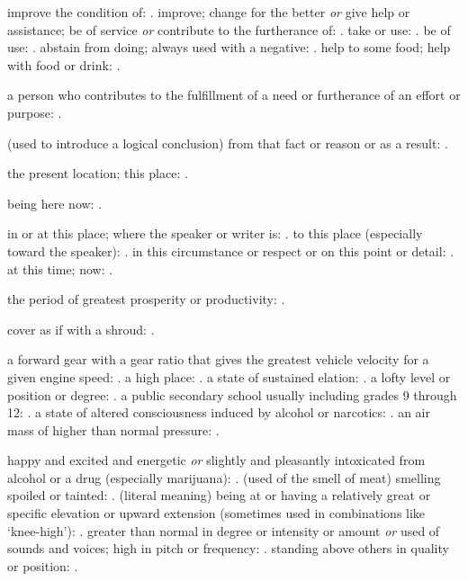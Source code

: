   improve the condition of: . improve; change for the better \textit{or} give help or assistance; be of service \textit{or} contribute to the furtherance of: . take or use: . be of use: . abstain from doing; always used with a negative: . help to some food; help with food or drink: .

  a person who contributes to the fulfillment of a need or furtherance of an effort or purpose: .

  (used to introduce a logical conclusion) from that fact or reason or as a result: .

  the present location; this place: .

  being here now: .

  in or at this place; where the speaker or writer is: . to this place (especially toward the speaker): . in this circumstance or respect or on this point or detail: . at this time; now: .

  the period of greatest prosperity or productivity: .

  cover as if with a shroud: .

  a forward gear with a gear ratio that gives the greatest vehicle velocity for a given engine speed: . a high place: . a state of sustained elation:   . a lofty level or position or degree: . a public secondary school usually including grades 9 through 12: . a state of altered consciousness induced by alcohol or narcotics: . an air mass of higher than normal pressure: .

  happy and excited and energetic \textit{or} slightly and pleasantly intoxicated from alcohol or a drug (especially marijuana): . (used of the smell of meat) smelling spoiled or tainted: . (literal meaning) being at or having a relatively great or specific elevation or upward extension (sometimes used in combinations like `knee-high'): . greater than normal in degree or intensity or amount \textit{or} used of sounds and voices; high in pitch or frequency: . standing above others in quality or position: .

